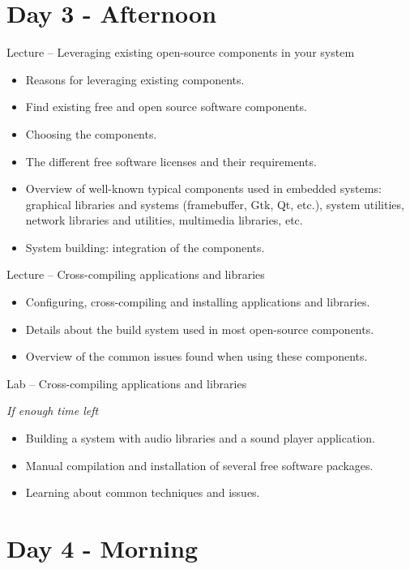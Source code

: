 \documentclass[a4paper,12pt,obeyspaces,spaces,hyphens]{article}
\begin{document}
\section{Day 3 - Afternoon}

\feagendaonecolumn
{Lecture – Leveraging existing open-source components in your system}
{
  \begin{itemize}
  \item Reasons for leveraging existing components.
  \item Find existing free and open source software components.
  \item Choosing the components.
  \item The different free software licenses and their requirements.
  \item Overview of well-known typical components used in
        embedded systems: graphical libraries and systems
        (framebuffer, Gtk, Qt, etc.), system utilities,
        network libraries and utilities, multimedia libraries, etc.
  \item System building: integration of the components.
  \end{itemize}
}

\feagendatwocolumn
{Lecture – Cross-compiling applications and libraries}
{
  \begin{itemize}
  \item Configuring, cross-compiling and installing applications and libraries.
  \item Details about the build system used in most open-source components.
  \item Overview of the common issues found when using these components.
  \end{itemize}
}
{Lab – Cross-compiling applications and libraries}
{
  {\em If enough time left}
  \begin{itemize}
  \item Building a system with audio libraries and a sound player application.
  \item Manual compilation and installation of several free software packages.
  \item Learning about common techniques and issues.
  \end{itemize}
}

\section{Day 4 - Morning}
\end{document}
